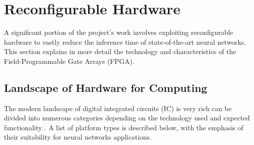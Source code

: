 \section{Reconfigurable Hardware}
A significant portion of the project's work involves exploiting reconfigurable hardware to vastly reduce the inference time of state-of-the-art neural networks. This section explains in more detail the technology and characteristics of the Field-Programmable Gate Arrays (FPGA).

\subsection{Landscape of Hardware for Computing}
The modern landscape of digital integrated circuits (IC) is very rich can be divided into numerous categories depending on the technology used and expected functionality \cite{14-najafi2017hardware}. A list of platform types is described below, with the emphasis of their suitability for neural networks applications.


